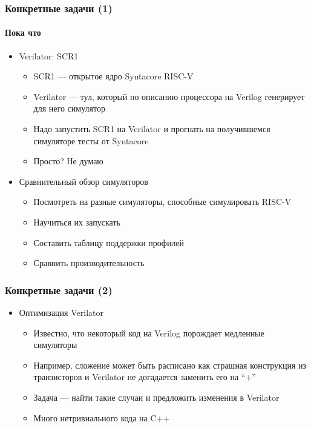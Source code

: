 \documentclass{slides-style}
\begin{document}
    \begin{frame}
        \frametitle{Конкретные задачи (1)}
        \framesubtitle{Пока что}
        \begin{itemize}
            \item Verilator: SCR1
            \begin{itemize}
                \item SCR1 --- открытое ядро Syntacore RISC-V
                \item Verilator --- тул, который по описанию процессора на Verilog генерирует для него симулятор
                \item Надо запустить SCR1 на Verilator и прогнать на получившемся симуляторе тесты от Syntacore
                \item Просто? Не думаю
            \end{itemize}
            \item Сравнительный обзор симуляторов
            \begin{itemize}
                \item Посмотреть на разные симуляторы, способные симулировать RISC-V
                \item Научиться их запускать
                \item Составить таблицу поддержки профилей
                \item Сравнить производительность
            \end{itemize}
        \end{itemize}
    \end{frame}

    \begin{frame}
        \frametitle{Конкретные задачи (2)}
        \begin{itemize}
            \item Оптимизация Verilator
            \begin{itemize}
                \item Известно, что некоторый код на Verilog порождает медленные симуляторы
                \item Например, сложение может быть расписано как страшная конструкция из транзисторов и Verilator не догадается заменить его на ``+''
                \item Задача --- найти такие случаи и предложить изменения в Verilator
                \item Много нетривиального кода на C++
            \end{itemize}
        \end{itemize}
    \end{frame}
\end{document}
